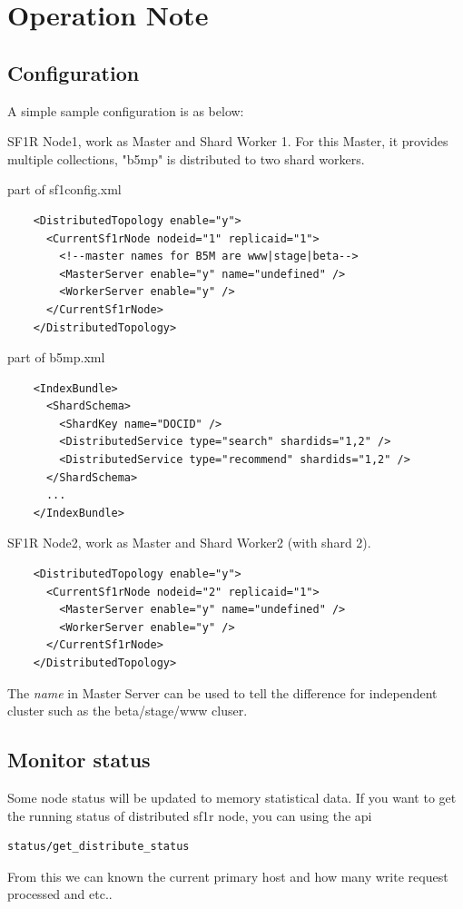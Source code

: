 \section{Operation Note}
\subsection{Configuration}
A simple sample configuration is as below:

SF1R Node1, work as Master and Shard Worker 1. For this Master, it provides multiple collections, "b5mp" is distributed to two shard workers.

part of sf1config.xml
\begin{lstlisting}
    <DistributedTopology enable="y">
      <CurrentSf1rNode nodeid="1" replicaid="1">
        <!--master names for B5M are www|stage|beta-->
        <MasterServer enable="y" name="undefined" />
        <WorkerServer enable="y" />
      </CurrentSf1rNode>
    </DistributedTopology>
\end{lstlisting}

part of b5mp.xml
\begin{lstlisting}
    <IndexBundle>
      <ShardSchema>
        <ShardKey name="DOCID" />
        <DistributedService type="search" shardids="1,2" />
        <DistributedService type="recommend" shardids="1,2" />
      </ShardSchema>
      ...
    </IndexBundle>
\end{lstlisting}

SF1R Node2, work as Master and Shard Worker2 (with shard 2).
\begin{lstlisting}
    <DistributedTopology enable="y">
      <CurrentSf1rNode nodeid="2" replicaid="1">
        <MasterServer enable="y" name="undefined" />
        <WorkerServer enable="y" />
      </CurrentSf1rNode>
    </DistributedTopology>
\end{lstlisting}

The \emph{name} in Master Server can be used to tell the difference for independent cluster such as the beta/stage/www cluser.

\subsection{Monitor status}
Some node status will be updated to memory statistical data. If you want to get the running status of distributed sf1r node, you can using the api
\begin{lstlisting}
status/get_distribute_status
\end{lstlisting}
From this we can known the current primary host and how many write request processed and etc..

